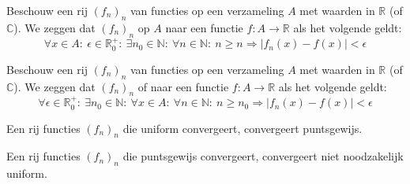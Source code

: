 \documentclass[main.tex]{subfiles}
\begin{document}
\begin{de}
  Beschouw een rij $(f_{n})_{n}$ van functies op een verzameling $A$ met waarden in $\mathbb{R}$ (of $\mathbb{C}$).
  We zeggen dat $(f_{n})_{n}$  op $A$ naar een functie $f: A \rightarrow \mathbb{R}$ als het volgende geldt:
  \[ \forall x\in A:\ \epsilon \in \mathbb{R}_{0}^{+}:\ \exists n_{0}\in \mathbb{N}:\ \forall n\in \mathbb{N}:\ n \ge n \Rightarrow |f_{n}(x)-f(x)| < \epsilon \]
\end{de}

\begin{de}
  Beschouw een rij $(f_{n})_{n}$ van functies op een verzameling $A$ met waarden in $\mathbb{R}$ (of $\mathbb{C}$).
  We zeggen dat $(f_{n})_{n}$  of  naar een functie $f: A \rightarrow \mathbb{R}$ als het volgende geldt:
  \[ \forall \epsilon \in \mathbb{R}_{0}^{+}:\ \exists n_{0} \in \mathbb{N}:\ \forall x \in A:\ \forall n\in \mathbb{N}:\ n \ge n_{0} \Rightarrow |f_{n}(x)-f(x)| < \epsilon \]
\end{de}

\begin{st}
  \label{str:uniform-dan-puntsgewijs}
  Een rij functies $(f_{n})_{n}$ die uniform convergeert, convergeert puntsgewijs.
\end{st}

\begin{tvb}
  Een rij functies $(f_{n})_{n}$ die puntsgewijs convergeert, convergeert niet noodzakelijk uniform.
\end{tvb}
\end{document}
